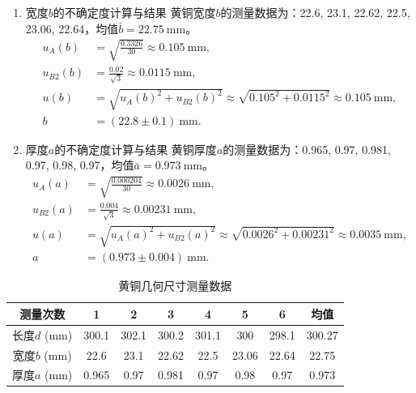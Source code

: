 \documentclass[11pt]{article}
\begin{document}
\begin{enumerate}
\begin{enumerate}
  \item 宽度\( b \)的不确定度计算与结果
  黄铜宽度\( b \)的测量数据为：22.6, 23.1, 22.62, 22.5, 23.06, 22.64，均值\( \bar{b} = 22.75\ \text{mm} \)。
  \begin{align*}
    u_A(b) &= \sqrt{\frac{0.3326}{30}} \approx 0.105\ \text{mm}, \\
    u_{B2}(b) &= \frac{0.02}{\sqrt{3}} \approx 0.0115\ \text{mm}, \\
    u(b) &= \sqrt{u_A(b)^2 + u_{B2}(b)^2} \approx \sqrt{0.105^2 + 0.0115^2} \approx 0.105\ \text{mm}, \\
    b &= (22.8 \pm 0.1)\ \text{mm}.
  \end{align*}

  \item 厚度\( a \)的不确定度计算与结果
  黄铜厚度\( a \)的测量数据为：0.965, 0.97, 0.981, 0.97, 0.98, 0.97，均值\( \bar{a} = 0.973\ \text{mm} \)。
  \begin{align*}
    u_A(a) &= \sqrt{\frac{0.000204}{30}} \approx 0.0026\ \text{mm}, \\
    u_{B2}(a) &= \frac{0.004}{\sqrt{3}} \approx 0.00231\ \text{mm}, \\
    u(a) &= \sqrt{u_A(a)^2 + u_{B2}(a)^2} \approx \sqrt{0.0026^2 + 0.00231^2} \approx 0.0035\ \text{mm}, \\
    a &= (0.973 \pm 0.004)\ \text{mm}.
  \end{align*}
\end{enumerate}

\begin{table}[htbp]
  \centering
  \caption{黄铜几何尺寸测量数据}
  \vspace{0.5em}
  \begin{tabular}{cccccccc}
    \toprule
    测量次数 & 1 & 2 & 3 & 4 & 5 & 6 & 均值 \\
    \midrule
    长度$d$ (mm) & 300.1 & 302.1 & 300.2 & 301.1 & 300 & 298.1 & 300.27 \\
    宽度$b$ (mm) & 22.6 & 23.1 & 22.62 & 22.5 & 23.06 & 22.64 & 22.75 \\
    厚度$a$ (mm) & 0.965 & 0.97 & 0.981 & 0.97 & 0.98 & 0.97 & 0.973 \\
    \bottomrule
  \end{tabular}
  \label{tab:three_line_measurement}
\end{table}


\end{enumerate}
\end{document}
